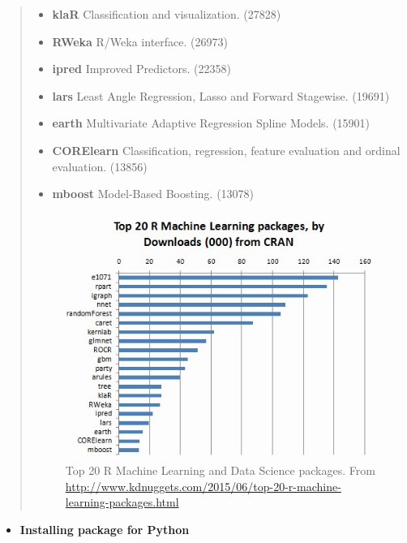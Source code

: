 \documentclass[letterpaper,11pt,english]{sphinxmanual}
\begin{document}
\begin{quote}
\begin{itemize}
\item {} 
\textbf{klaR} Classification and visualization. (27828)

\item {} 
\textbf{RWeka} R/Weka interface. (26973)

\item {} 
\textbf{ipred} Improved Predictors. (22358)

\item {} 
\textbf{lars} Least Angle Regression, Lasso and Forward Stagewise. (19691)

\item {} 
\textbf{earth} Multivariate Adaptive Regression Spline Models. (15901)

\item {} 
\textbf{CORElearn} Classification, regression, feature evaluation and ordinal evaluation. (13856)

\item {} 
\textbf{mboost} Model-Based Boosting. (13078)

\end{itemize}
\begin{figure}[htbp]
\centering
\capstart

\includegraphics{top20rpkg.jpg}
\caption{Top 20 R Machine Learning and Data Science packages. From \href{http://www.kdnuggets.com/2015/06/top-20-r-machine-learning-packages.html}{http://www.kdnuggets.com/2015/06/top-20-r-machine-learning-packages.html}}\end{figure}
\end{quote}
\begin{itemize}
\item {} 
\textbf{Installing package for Python}

\end{itemize}
\end{document}
